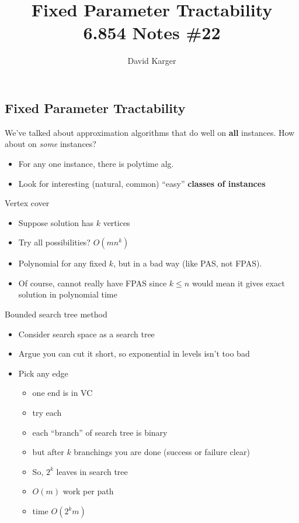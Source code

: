 \documentclass{article}
\title{Fixed Parameter Tractability\\ 6.854 Notes \#22}
\author{David Karger}
\begin{document}
\subsection{Fixed Parameter Tractability}

We've talked about approximation algorithms that do well on \textbf{all}
instances.  How about on \emph{some} instances?
\begin{itemize}
\item For any one instance, there is polytime alg.
\item Look for interesting (natural, common) ``easy'' \bf{classes} of
instances
\end{itemize}

Vertex cover
\begin{itemize}
\item Suppose solution has $k$ vertices
\item Try all possibilities?  $O(mn^k)$
\item Polynomial for any fixed $k$, but in a bad way (like PAS, not
  FPAS).
\item Of course, cannot really have FPAS since $k \leq n$ would mean it
  gives exact solution in polynomial time
\end{itemize}

Bounded search tree method
\begin{itemize}
\item Consider search space as a search tree
\item Argue you can cut it short, so exponential in levels isn't too bad
\item Pick any edge
\begin{itemize}
\item one end is in VC
\item try each
\item each ``branch'' of search tree is binary
\item but after $k$ branchings you are done (success or failure clear)
\item So, $2^k$ leaves in search tree
\item $O(m)$ work per path
\item time $O(2^k m)$
\end{itemize}
\end{itemize}
\end{document}
